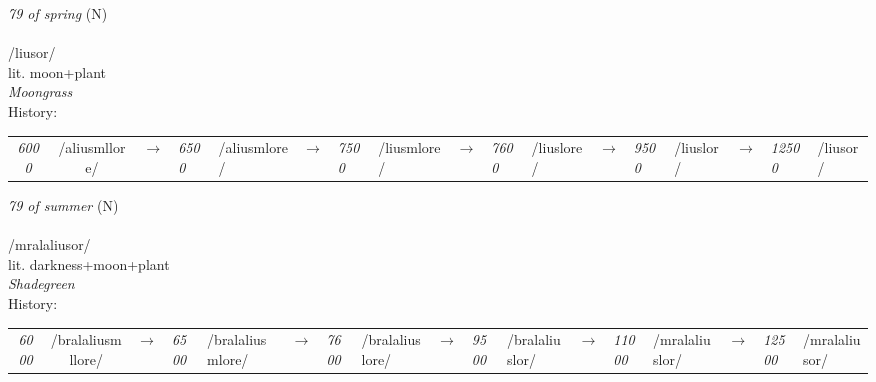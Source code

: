 \vspace{15pt}
\begin{nopagebreak}
 \textit{79 of spring} (N)\\
\\
\noindent /li{\textprimstress}usor/\\
\noindent lit. moon+plant\\
\noindent \textit{Moongrass}\\


\noindent History:

\vspace{-0pt}
\hspace{40pt}
\begin{tabular}{ccc}
\textit{6000} & /aliusmllore/&$\rightarrow$ & \textit{6500} & /aliusmlore/&$\rightarrow$ & \textit{7500} & /liusmlore/&$\rightarrow$ & \textit{7600} & /liuslore/&$\rightarrow$ & \textit{9500} & /liuslor/&$\rightarrow$ & \textit{12500} & /liusor/& \\
\end{tabular}

\vspace{20pt}\hline

\end{nopagebreak}
\filbreak



\vspace{15pt}
\begin{nopagebreak}
 \textit{79 of summer} (N)\\
\\
\noindent /mralali{\textprimstress}usor/\\
\noindent lit. darkness+moon+plant\\
\noindent \textit{Shadegreen}\\


\noindent History:

\vspace{-0pt}
\hspace{40pt}
\begin{tabular}{ccc}
\textit{6000} & /bralaliusmllore/&$\rightarrow$ & \textit{6500} & /bralaliusmlore/&$\rightarrow$ & \textit{7600} & /bralaliuslore/&$\rightarrow$ & \textit{9500} & /bralaliuslor/&$\rightarrow$ & \textit{11000} & /mralaliuslor/&$\rightarrow$ & \textit{12500} & /mralaliusor/& \\
\end{tabular}

\vspace{20pt}\hline

\end{nopagebreak}
\filbreak



